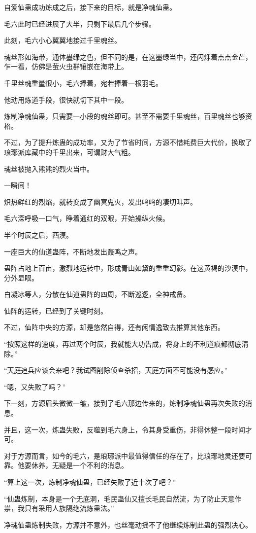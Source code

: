 \begin{this_body}
自爱仙蛊成功炼成之后，接下来的目标，就是净魂仙蛊。

毛六此时已经进展了大半，只剩下最后几个步骤。

此刻，毛六小心翼翼地接过千里魂丝。

魂丝形如海带，通体墨绿之色，但不同的是，在这墨绿当中，还闪烁着点点金芒，乍一看，仿佛是萤火虫群镶嵌在海带上。

千里丝魂重量很小，毛六捧着，宛若捧着一根羽毛。

他动用炼道手段，很快就切下其中一段。

炼制净魂仙蛊，只需要一小段的魂丝即可。甚至不需要千里魂丝，百里魂丝也够资格。

不过，为了提升炼蛊的成功率，又为了节省时间，方源不惜耗费巨大代价，换取了琅琊派库藏中的千里出来，可谓财大气粗。

魂丝被抛入熊熊的烈火当中。

一瞬间！

炽热鲜红的烈焰，就转变成了幽冥鬼火，发出呜呜的凄切叫声。

毛六深呼吸一口气，睁着通红的双眼，开始操纵火候。

半个时辰之后，西漠。

一座巨大的仙道蛊阵，不断地发出轰鸣之声。

蛊阵占地上百亩，激烈地运转中，形成青山如黛的重重幻影。在这黄褐的沙漠中，分外显眼。

白凝冰等人，分散在仙道蛊阵的四周，不断巡逻，全神戒备。

仙阵的运转，已经到了关键时刻。

不过，仙阵中央的方源，却是悠然自得，还有闲情逸致去推算其他东西。

“按照这样的速度，再过两个时辰，我就能大功告成，将身上的不利道痕都彻底清除。”

“天庭追兵应该会来吧？我试图削除侦查杀招，天庭方面不可能没有感应。”

“嗯，又失败了吗？”

下一刻，方源眉头微微一皱，接到了毛六那边传来的，炼制净魂仙蛊再次失败的消息。

并且，这一次，炼蛊失败，反噬到毛六身上，令其身受重伤，非得休整一段时间才可。

对于方源而言，如今的毛六，是琅琊派中最值得信任的存在了，比琅琊地灵还要可靠。他要休养，无疑是一个不利的消息。

“算上这一次，炼制净魂仙蛊，已经失败了近十次了吧？”

“仙蛊炼制，本身是一个无底洞，毛民蛊仙又擅长毛民自然流，为了防止天意作祟，我只有采用人族隔绝流炼蛊法。”

净魂仙蛊炼制失败，方源并不意外，也丝毫动摇不了他继续炼制此蛊的强烈决心。


\end{this_body}
